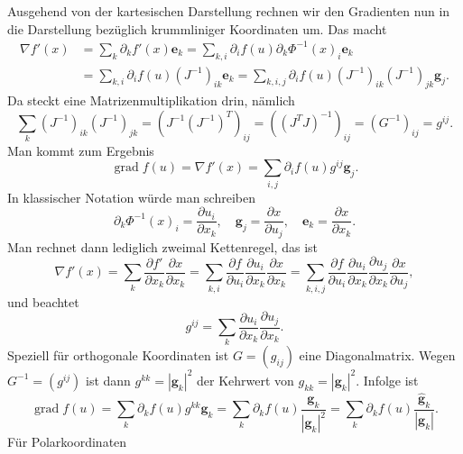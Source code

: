 Ausgehend von der kartesischen Darstellung rechnen wir den
Gradienten nun in die Darstellung bezüglich
krummliniger Koordinaten um. Das macht
\begin{align}
\nabla f'(x) &= \sum_k\partial_k f'(x)\mathbf e_k
= \sum_{k,i}\partial_i f(u)\partial_k\Phi^{-1}(x)_i\mathbf e_k\\
&= \sum_{k,i}\partial_i f(u) (J^{-1})_{ik}\mathbf e_k
= \sum_{k,i,j}\partial_i f(u) (J^{-1})_{ik}(J^{-1})_{jk}\mathbf g_j.
\end{align}
Da steckt eine Matrizenmultiplikation drin, nämlich
\begin{equation}
\sum_{k} (J^{-1})_{ik}(J^{-1})_{jk} = (J^{-1}(J^{-1})^T)_{ij}
= ((J^T J)^{-1})_{ij} = (G^{-1})_{ij} = g^{ij}.
\end{equation}
Man kommt zum Ergebnis
\begin{equation}
\operatorname{grad} f(u) = \nabla f'(x)
= \sum_{i,j}\partial_i f(u) g^{ij}\mathbf g_j.
\end{equation}
In klassischer Notation würde man schreiben
\begin{equation}
\partial_k\Phi^{-1}(x)_i = \frac{\partial u_i}{\partial x_k},\quad
\mathbf g_j = \frac{\partial x}{\partial u_j},\quad
\mathbf e_k = \frac{\partial x}{\partial x_k}.
\end{equation}
Man rechnet dann lediglich zweimal Kettenregel, das ist
\begin{equation}
\nabla f'(x) = \sum_k\frac{\partial f'}{\partial x_k}\frac{\partial x}{\partial x_k}
= \sum_{k,i}\frac{\partial f}{\partial u_i}
\frac{\partial u_i}{\partial x_k}\frac{\partial x}{\partial x_k}
= \sum_{k,i,j}\frac{\partial f}{\partial u_i}\frac{\partial u_i}{\partial x_k}
\frac{\partial u_j}{\partial x_k}\frac{\partial x}{\partial u_j},
\end{equation}
und beachtet
\begin{equation}
g^{ij} = \sum_k\frac{\partial u_i}{\partial x_k}\frac{\partial u_j}{\partial x_k}.
\end{equation}
Speziell für orthogonale Koordinaten ist $G=(g_{ij})$ eine
Diagonalmatrix. Wegen $G^{-1}=(g^{ij})$ ist dann
$g^{kk} = |\mathbf g_k|^2$ der Kehrwert von
$g_{kk} = |\mathbf g_k|^2$. Infolge ist
\begin{equation}
\operatorname{grad} f(u)
= \sum_k\partial_k f(u)g^{kk}\mathbf g_k
= \sum_k\partial_k f(u)\frac{\mathbf g_k}{|\mathbf g_k|^2}
= \sum_k\partial_k f(u)\frac{\mathbf {\hat g}_k}{|\mathbf g_k|}.
\end{equation}
Für Polarkoordinaten
